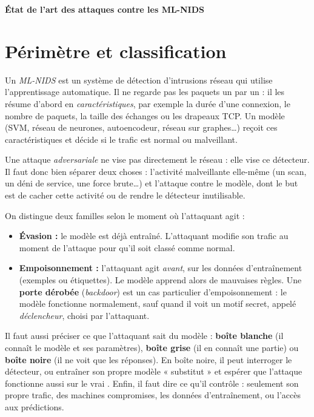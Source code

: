 \documentclass[a4paper,10pt]{article}
\begin{document}
\begin{center}
  {\Large\bfseries État de l'art des attaques contre les ML-NIDS}\par
  \vspace{3pt}
\end{center}
\vspace{-5pt}

\section{Périmètre et classification}
Un \emph{ML-NIDS} est un système de détection d'intrusions réseau qui utilise
l'apprentissage automatique. Il ne regarde pas les paquets un par un : il les
résume d'abord en \emph{caractéristiques}, par exemple la durée d'une connexion,
le nombre de paquets, la taille des échanges ou les drapeaux TCP. Un modèle
(SVM, réseau de neurones, autoencodeur, réseau sur graphes\dots) reçoit ces
caractéristiques et décide si le trafic est normal ou malveillant.

Une attaque \emph{adversariale} ne vise pas directement le réseau : elle vise ce
détecteur. Il faut donc bien séparer deux choses : l'activité malveillante
elle-même (un scan, un déni de service, une force brute\dots) et l'attaque
contre le modèle, dont le but est de cacher cette activité ou de rendre le
détecteur inutilisable.

On distingue deux familles selon le moment où l'attaquant agit :
\begin{itemize}
  \item \textbf{Évasion :} le modèle est déjà entraîné. L'attaquant modifie son
  trafic au moment de l'attaque pour qu'il soit classé comme normal.
  \item \textbf{Empoisonnement :} l'attaquant agit \emph{avant}, sur les données
  d'entraînement (exemples ou étiquettes). Le modèle apprend alors de mauvaises
  règles. Une \textbf{porte dérobée} (\emph{backdoor}) est un cas particulier
  d'empoisonnement : le modèle fonctionne normalement, sauf quand il voit un
  motif secret, appelé \emph{déclencheur}, choisi par l'attaquant.
\end{itemize}
Il faut aussi préciser ce que l'attaquant sait du modèle :
\textbf{boîte blanche} (il connaît le modèle et ses paramètres),
\textbf{boîte grise} (il en connaît une partie) ou \textbf{boîte noire} (il ne
voit que les réponses). En boîte noire, il peut interroger le détecteur, ou
entraîner son propre modèle « substitut » et espérer que l'attaque fonctionne
aussi sur le vrai \cite{han,mao,zhang}. Enfin, il faut dire ce qu'il contrôle :
seulement son propre trafic, des machines compromises, les données
d'entraînement, ou l'accès aux prédictions.
\end{document}
